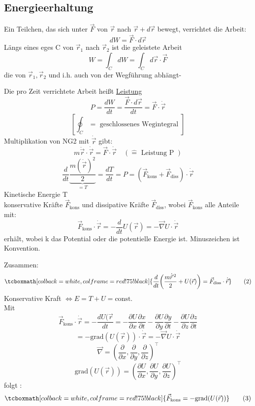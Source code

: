 \documentclass[titlepage,12pt,a4paper,ngerman]{report}
\newcommand{\tx}[1]{\textrm{#1}}
\newcommand{\ub}[1]{\underbrace{#1}}
\newcommand{\grad}{\tx{grad}}
\newcommand{\rmbox}[1]{\tcboxmath[colback=white,colframe=red!75!black]{#1}} %
\renewcommand{\boxed}{\rmbox}
\begin{document}
{\subsection{Energieerhaltung}
Ein Teilchen, das sich unter $\vec{F}$ von $\vec{r}$ nach $\vec{r} + d\vec{r}$ bewegt, verrichtet die Arbeit:
$$ dW = \vec{F} \cdot d \vec{r}$$
Längs eines eges C von $\vec{r}_{1}$ nach $\vec{r}_{2}$ ist die geleistete Arbeit
$$W = \int_C dW = \int_C d\vec{r}\cdot \vec{F}$$
die von $\vec{r}_1, \vec{r}_2$ und i.h. auch von der Wegführung abhängt-\par
Die pro Zeit verrichtete Arbeit heißt \underline{Leistung} 
$$ P = \frac{dW}{dt} = \frac{\vec{F}\cdot d \vec{r}}{dt} = \vec{F}\cdot \dot{\vec{r}}$$
$$[\oint_C = \textrm{ geschlossenes Wegintegral }]$$
Multiplikation von NG2 mit $\dot{\vec{r}}$ gibt:
$$ m\ddot{\vec{r}} \cdot \dot{\vec{r}} =\vec{F} \cdot \dot{\vec{r}} \quad ( \widehat{=} \tx{ Leistung P })$$
$$\frac{d}{dt} \ub{\frac{m(\dot{\vec{r}})^2}{2}}_{=T} = \frac{dT}{dt} = P = (\vec{F}_{\tx{kons}} + \vec{F}_{\tx{diss}}) \cdot \dot{\vec{r}} $$
Kinetische Energie T\\
konservative Kräfte $\vec{F}_{\tx{kons}}$ und dissipative Kräfte $\vec{F}_{\tx{diss}}$, wobei $\vec{F}_{\tx{kons}}$ alle Anteile mit:
$$\vec{F}_{\tx{kons}} \cdot \dot{\vec{r}} = - \frac{d}{dt} U(\vec{r}) = - \vec{\nabla} U \cdot \dot{\vec{r}}$$
erhält, wobei k das Potential oder die potentielle Energie ist.
Minuszeichen ist Konvention.\par
Zusammen:
\begin{equation*}
\boxed{\frac{d}{dt} \bigg( \frac{m \dot{\vec{r}}^{\,2}}{2} + U(\vec{r})\bigg)= \vec{F}_{\tx{diss}}
\cdot \dot{\vec{r}}} \tag{2}
\end{equation*}
Konservative Kraft $\Leftrightarrow E = T+U=\tx{const.}$\\
Mit 
$$ \vec{F}_{\tx{kons}} \cdot \dot{\vec{r}} = - \frac{dU(\vec{r}}{dt} = -\frac{\partial U}{\partial x}\frac{\partial x}{\partial t} - \frac{\partial U}{\partial y}\frac{\partial y }{\partial t} - \frac{\partial U}{\partial z} \frac{\partial z }{\partial t}$$
$$ = - \grad(U(\vec{r})) \cdot  \dot{\vec{r}} = - \vec{\nabla} U \cdot \dot{\vec{r}}$$
$$ \vec{\nabla} = ( \frac{\partial }{\partial x}, \frac{\partial }{\partial y}, \frac{\partial }{\partial z}) ^\top$$
$$ \grad(U(\vec{r})) = ( \frac{\partial U}{\partial x}, \frac{\partial U}{\partial y}, \frac{\partial U}{\partial z}) ^\top$$
folgt :
\begin{equation*}
\boxed{\vec{F}_{\tx{kons}} = - \grad(U(\vec{r}))} \tag{3}
\end{equation*}

}
\end{document}
